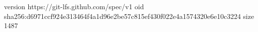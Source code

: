version https://git-lfs.github.com/spec/v1
oid sha256:d6971ccf924e313464f4a1d96e2be57c815ef430f022e4a1574320e6e10c3224
size 1487
